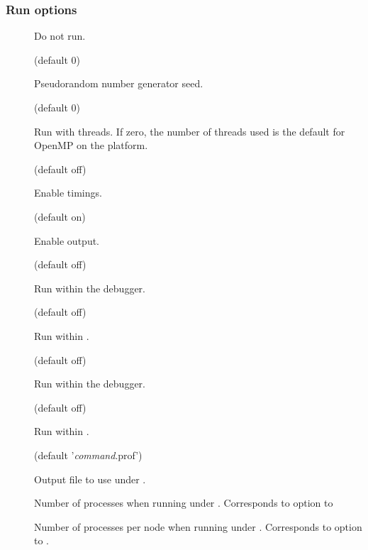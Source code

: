 \subsubsection{Run options}

\begin{description}
\item[]

Do not run.

\item[] (default 0)

Pseudorandom number generator seed.

\item[] (default 0)

Run with  threads. If zero, the number of threads used is the
default for OpenMP on the platform.

\item[] (default off)

Enable timings.

\item[] (default on)

Enable output.

\item[] (default off)

Run within the  debugger.

\item[] (default off)

Run within .

\item[] (default off)

Run within the  debugger.

\item[] (default off)

Run within .

\item[] (default '\textsl{command}.prof')

Output file to use under .

\item[]

Number of processes when running under . Corresponds to 
option to 

\item[]

Number of processes per node when running under . Corresponds to
 option to .

\end{description}

